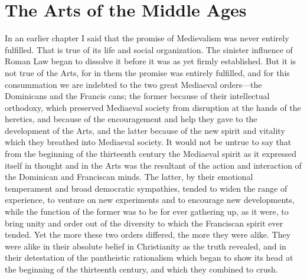 \documentclass{book}
\begin{document}
\chapter{The Arts of the Middle Ages}
\label{chapter-8}
In an earlier chapter I said that the promise of Medievalism was never entirely fulfilled. That is true of its life and social organization. The sinister influence of Roman Law began to dissolve it before it was as yet firmly established. But it is not true of the Arts, for in them the promise was entirely fulfilled, and for this consummation we are indebted to the two great Mediaeval orders—the Dominicans and the Francis cans; the former because of their intellectual orthodoxy, which preserved Mediaeval society from disruption at the hands of the heretics, and because of the encouragement and help they gave to the development of the Arts, and the latter because of the new spirit and vitality which they breathed into Mediaeval society. It would not be untrue to say that from the beginning of the thirteenth century the Mediaeval spirit as it expressed itself in thought and in the Arts was the resultant of the action and interaction of the Dominican and Franciscan minds. The latter, by their emotional temperament and broad democratic sympathies, tended to widen the range of experience, to venture on new experiments and to encourage new developments, while the function of the former was to be for ever gathering up, as it were, to bring unity and order out of the diversity to which the Franciscan spirit ever tended. Yet the more these two orders differed, the more they were alike. They were alike in their absolute belief in Christianity as the truth revealed, and in their detestation of the pantheistic rationalism which began to show its head at the beginning of the thirteenth century, and which they combined to crush.
\end{document}
